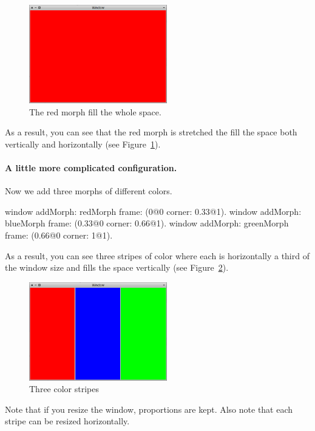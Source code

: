 \documentclass[a4paper,10pt,twoside]{book}
\begin{document}
\begin{figure}[ht]\centering
	\includegraphics[width=6cm]{SimpleLayoutExample1}
	\caption{The red morph fill the whole space.}
	\label{fig:simpleLayoutExample1}
\end{figure}

As a result, you can see that the red morph is stretched the fill the space both vertically and horizontally (see Figure~\ref{fig:simpleLayoutExample1}).


\paragraph{A little more complicated configuration.}
Now we add three morphs of different colors. 

\begin{code}{}
window
	addMorph: redMorph
	frame: (0@0 corner: 0.33@1).
window
	addMorph: blueMorph
	frame: (0.33@0 corner: 0.66@1).
window
	addMorph: greenMorph
	frame: (0.66@0 corner: 1@1).
\end{code}

As a result, you can see three stripes of color where each is horizontally a third of the window size and fills the space vertically (see Figure~\ref{fig:simpleLayoutExample2}).

\begin{figure}[ht]\centering
	\includegraphics[width=6cm]{SimpleLayoutExample2}
	\caption{Three color stripes}
	\label{fig:simpleLayoutExample2}
\end{figure}

Note that if you resize the window, proportions are kept. Also note that each stripe can be resized horizontally.
\end{document}
